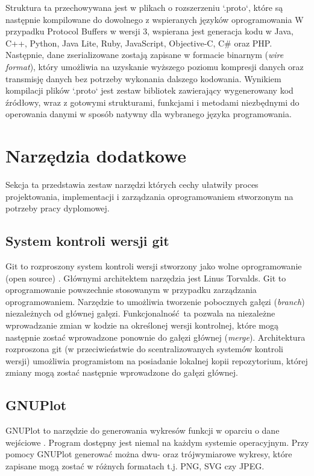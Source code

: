 \documentclass[a4paper,12pt,twoside,openany]{report}
\begin{document}
Struktura ta przechowywana jest w plikach o rozszerzeniu `.proto`, które są następnie kompilowane do dowolnego z wspieranych języków oprogramowania 
W przypadku Protocol Buffers w wersji 3, wspierana jest generacja kodu w Java, C++, Python, Java Lite, Ruby, JavaScript, Objective-C, C\# oraz PHP.
Następnie, dane zserializowane zostają zapisane w formacie binarnym (\textit{wire format}), który umożliwia na uzyskanie wyższego poziomu kompresji danych oraz transmisję danych 
bez potrzeby wykonania dalszego kodowania. 
Wynikiem kompilacji plików `.proto` jest zestaw bibliotek zawierający wygenerowany kod źródłowy, wraz z gotowymi strukturami, funkcjami i metodami niezbędnymi do 
operowania danymi w sposób natywny dla wybranego języka programowania.

\section{Narzędzia dodatkowe}

Sekcja ta przedstawia zestaw narzędzi których cechy ułatwiły proces projektowania, implementacji i zarządzania oprogramowaniem stworzonym na potrzeby
pracy dyplomowej.

\subsection{System kontroli wersji git}
Git to rozproszony system kontroli wersji stworzony jako wolne oprogramowanie (open source) \cite{gitBook}. 
Głównymi architektem narzędzia jest Linus Torvalds. Git to oprogramowanie powszechnie stosowanym w przypadku zarządzania oprogramowaniem.
Narzędzie to umożliwia tworzenie pobocznych gałęzi (\textit{branch}) niezależnych od głównej gałęzi. Funkcjonalność ta pozwala na niezależne wprowadzanie zmian
w kodzie na określonej wersji kontrolnej, które mogą następnie zostać wprowadzone ponownie do gałęzi głównej (\textit{merge}).
Architektura rozproszona git (w przeciwieństwie do scentralizowanych systemów kontroli wersji) umożliwia programistom na posiadanie lokalnej kopii repozytorium,
której zmiany mogą zostać następnie wprowadzone do gałęzi głównej.

\subsection{GNUPlot}

GNUPlot to narzędzie do generowania wykresów funkcji w oparciu o dane wejściowe \cite{gnuplotBook}. Program dostępny jest niemal na każdym systemie operacyjnym.
Przy pomocy GNUPlot generować można dwu- oraz trójwymiarowe wykresy, które zapisane mogą zostać w różnych formatach t.j. PNG, SVG czy JPEG.
\end{document}
